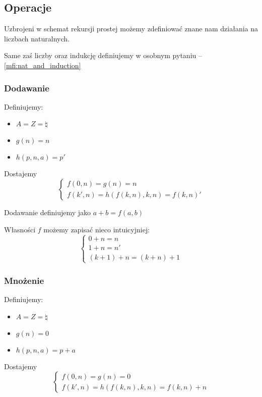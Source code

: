 \subsection{Operacje}

Uzbrojeni w schemat rekursji prostej możemy zdefiniować znane nam działania na liczbach naturalnych.

Same zaś liczby oraz indukcję definiujemy w osobnym pytaniu -- \ref{mfi:nat_and_induction}

\subsubsection{Dodawanie}

Definiujemy:
\begin{itemize}
	\item \( A = Z = \natural \)
	\item \( g(n) = n \)
	\item \( h(p, n, a) = p' \)
\end{itemize}

Dostajemy
\[
	\begin{cases}
		f(0, n) = g(n) = n \\
		f(k', n) = h(f(k, n), k, n) = f(k, n)'
	\end{cases}
\]

Dodawanie definiujemy jako \( a + b = f(a, b) \)

Własności \( f \) możemy zapisać nieco intuicyjniej:
\[
	\begin{cases}
		0 + n = n  \\
		1 + n = n' \\
		(k + 1) + n = (k + n) + 1
	\end{cases}
\]


\subsubsection{Mnożenie}
Definiujemy:
\begin{itemize}
	\item \( A = Z = \natural \)
	\item \( g(n) = 0 \)
	\item \( h(p, n, a) = p + a \)
\end{itemize}

Dostajemy
\[
	\begin{cases}
		f(0, n) = g(n) = 0 \\
		f(k', n) = h(f(k, n), k, n) = f(k, n) + n
	\end{cases}
\]

